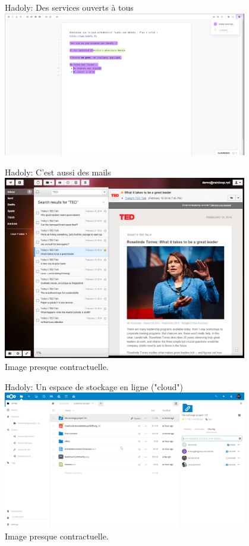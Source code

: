 \begin{frame}{Hadoly: Des services ouverts à tous}
  \centering
  \includegraphics[width=0.8\textwidth]{un_autre_internet/pad_hadoly.png}\\
\end{frame}

\begin{frame}{Hadoly: C'est aussi des mails}
  \centering
  \includegraphics[width=0.8\textwidth]{un_autre_internet/rainloop.png}\\
  \tiny Image presque contractuelle.
\end{frame}

\begin{frame}{Hadoly: Un espace de stockage en ligne ("cloud")}
  \centering
  \includegraphics[width=0.8\textwidth]{un_autre_internet/nextcloud.png}\\
  \tiny Image presque contractuelle.
\end{frame}

